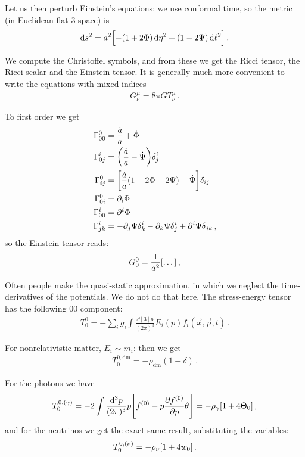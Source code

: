 \documentclass[main.tex]{subfiles}
\begin{document}
Let us then perturb Einstein's equations: we use conformal time, so the metric (in Euclidean flat 3-space) is 
%
\begin{align}
\dd{s^2} = a^2 \qty[- (1 + 2 \Phi ) \dd{\eta^2} + (1- 2 \Psi ) \dd{\ell^2}]
\,.
\end{align}

We compute the Christoffel symbols, and from these we get the Ricci tensor, the Ricci scalar and the Einstein tensor. 
It is generally much more convenient to write the equations with mixed indices 
%
\begin{align}
G^{\mu }_{\nu } = 8 \pi G T^{\mu }_{\nu }
\,.
\end{align}

To first order we get 
%
\begin{align}
\Gamma^{0}_{00} &= \frac{ \dot{a} }{a } + \dot{\Phi}  \\
\Gamma^{i}_{0j }&= \qty(\frac{\dot{a}}{a} - \dot{\Psi}) \delta^{i}_{j}  \\
\Gamma^{0}_{ij} &= \qty[\frac{\dot{a}}{a } \qty(1 - 2 \Phi - 2 \Psi ) - \dot{\Psi}] \delta_{ij}  \\
\Gamma^{0}_{0i} &= \partial_{i} \Phi   \\
\Gamma^{i}_{00} &= \partial^{i} \Phi   \\
\Gamma^{i}_{jk} &= - \partial_{j} \Psi \delta^{i}_{k} - \partial_{k} \Psi \delta^{i}_{j} + \partial^{i} \Psi 
\delta_{jk}
\,,
\end{align}
%
so the Einstein tensor reads: 
%
\begin{align}
G^{0}_{0} = \frac{1}{a^2} \qty[\dots]
\,,
\end{align}
%

Often people make the quasi-static approximation, in which we neglect the time-derivatives of the potentials. We do not do that here. 
The stress-energy tensor has the following 00 component: 
%
\begin{align}
T^{0}_{0} = - \sum _{i} g_i \int  \frac{ \dd[3]{p}}{(2 \pi )^3} E_i (p) f_i (\vec{x}, \vec{p} ,t)
\,.
\end{align}

For nonrelativistic matter, \(E_i \sim m_i\): then we get 
%
\begin{align}
T^{0, \text{dm}}_{0} = - \rho_{\text{dm}} (1 + \delta )
\,.
\end{align}

For the photons we have 
%
\begin{align}
T^{0,(\gamma )}_{0} = 
-2 \int \frac{\dd[3]{p}}{(2 \pi )^3} p \qty[f^{(0)} - p \pdv{f^{(0)}}{p} \theta ] 
= - \rho_{\gamma } \qty[ 1 + 4 \Theta_0 ]
\,,
\end{align}
%
and for the neutrinos we get the exact same result, substituting the variables: 
%
\begin{align}
T_{0}^{0, (\nu )} = - \rho_{\nu } \qty[1 + 4 w_0 ]
\,.
\end{align}
\end{document}
